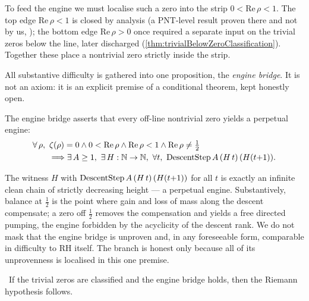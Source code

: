 To feed the engine we must localise such a zero into the strip $0<\mathrm{Re}\,\rho<1$. The top edge
$\mathrm{Re}\,\rho<1$ is closed by  analysis (a PNT-level result proven there and not
by us, ); the bottom edge $\mathrm{Re}\,\rho>0$ once
required a separate input on the trivial zeros below the line, later discharged
(\cref{thm:trivialBelowZeroClassification}). Together these place a nontrivial zero strictly inside
the strip.

All substantive difficulty is gathered into one proposition, the \emph{engine bridge}. It is not an
axiom: it is an explicit premise of a conditional theorem, kept honestly open.

\begin{definition}\label{def:EngineBridge}
The engine bridge asserts that every off-line nontrivial zero yields a perpetual engine:
\begin{equation}\label{eq:EngineBridge}
\begin{aligned}
  &\forall\,\rho,\ \zeta(\rho)=0 \wedge 0<\mathrm{Re}\,\rho \wedge \mathrm{Re}\,\rho<1 \wedge \mathrm{Re}\,\rho \ne \tfrac12\\
  &\qquad\Longrightarrow \exists\,A\ge 1,\ \exists\,H:\N\to\N,\ \forall t,\ \DescentStep A\,(H\,t)\,(H(t{+}1)).
\end{aligned}
\end{equation}
\end{definition}

The witness $H$ with $\operatorname{DescentStep} A\,(H\,t)\,(H(t{+}1))$ for all $t$ is exactly an infinite clean
chain of strictly decreasing height --- a perpetual engine. Substantively, balance at $\tfrac12$ is
the point where gain and loss of mass along the descent compensate; a zero off $\tfrac12$ removes
the compensation and yields a free directed pumping, the engine forbidden by the acyclicity of the
descent rank. We do not mask that the engine bridge is unproven and, in any foreseeable form,
comparable in difficulty to RH itself. The branch is honest only because all of its unprovenness is
localised in this one premise.

\begin{theorem}\label{thm:riemannHypothesis_of_engine_bridge}
\green{}\ If the trivial zeros are classified and the engine bridge holds, then the 
Riemann hypothesis follows. 
\end{theorem}

